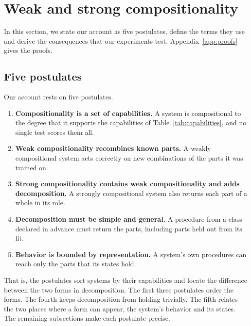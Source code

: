 \section{Weak and strong compositionality}
\label{sec:definition}

In this section, we state our account as five postulates, define the terms they use and derive the consequences that our experiments test. Appendix~\ref{app:proofs} gives the proofs.

\subsection{Five postulates}
\label{sec:postulates}

Our account rests on five postulates.
\begin{enumerate}[label=\textbf{P\arabic*.}, leftmargin=2.2em]
  \item \textbf{Compositionality is a set of capabilities.} A system is compositional to the degree that it supports the capabilities of Table~\ref{tab:capabilities}, and no single test scores them all.
  \item \textbf{Weak compositionality recombines known parts.} A weakly compositional system acts correctly on new combinations of the parts it was trained on.
  \item \textbf{Strong compositionality contains weak compositionality and adds decomposition.} A strongly compositional system also returns each part of a whole in its role.
  \item \textbf{Decomposition must be simple and general.} A procedure from a class declared in advance must return the parts, including parts held out from its fit.
  \item \textbf{Behavior is bounded by representation.} A system's own procedures can reach only the parts that its states hold.
\end{enumerate}
That is, the postulates sort systems by their capabilities and locate the difference between the two forms in decomposition. The first three postulates order the forms. The fourth keeps decomposition from holding trivially. The fifth relates the two places where a form can appear, the system's behavior and its states. The remaining subsections make each postulate precise.

